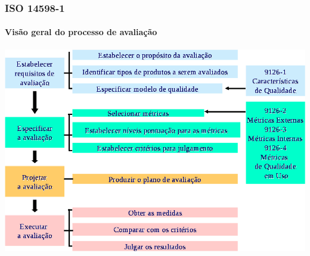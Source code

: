 \begin{frame}
	\frametitle{ISO 14598-1}
	\framesubtitle{Visão geral do processo de avaliação}

	\begin{block:fact}{}
		\centering
		\includegraphics[width=\textwidth]{software-engineering/project-management/product/iso14598/iso14598-evaluation-process}
	\end{block:fact}
\end{frame}

